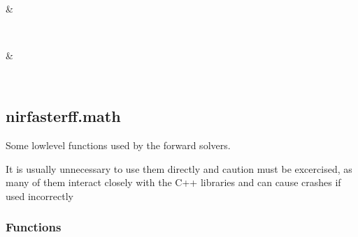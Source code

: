 \documentclass[letterpaper,10pt,english]{sphinxmanual}
\begin{document}
\begin{fulllineitems}
\begin{savenotes}
\begin{longtable}{}
\begin{varwidth}[t]{}
\sphinxbeforeendvarwidth
\end{varwidth}%
\\
\sphinxhline\begin{varwidth}[t]{}
\sphinxAtStartPar
{}
\sphinxbeforeendvarwidth
\end{varwidth}%
&\begin{varwidth}[t]{}
\sphinxAtStartPar

\sphinxbeforeendvarwidth
\end{varwidth}%
\\
\sphinxhline\begin{varwidth}[t]{}
\sphinxAtStartPar
{}
\sphinxbeforeendvarwidth
\end{varwidth}%
&\begin{varwidth}[t]{}
\sphinxAtStartPar

\sphinxbeforeendvarwidth
\end{varwidth}%
\\
\sphinxbottomrule
\end{longtable}
\sphinxtableafterendhook
\sphinxatlongtableend
\end{savenotes}

\end{fulllineitems}


\sphinxstepscope


\subsection{nirfasterff.math}
\label{\detokenize{_autosummary/nirfasterff.math:module-nirfasterff.math}}\label{\detokenize{_autosummary/nirfasterff.math:nirfasterff-math}}\label{\detokenize{_autosummary/nirfasterff.math::doc}}
\sphinxAtStartPar
Some low\sphinxhyphen{}level functions used by the forward solvers.

\sphinxAtStartPar
It is usually unnecessary to use them directly and caution must be excercised, as many of them interact closely with the C++ libraries and can cause crashes if used incorrectly
\subsubsection*{Functions}
\end{document}
